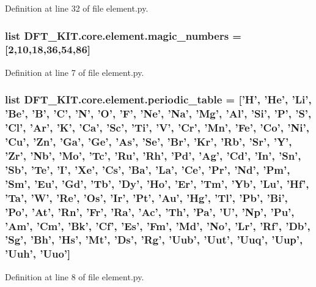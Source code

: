 Definition at line 32 of file element.\+py.

\hypertarget{namespace_d_f_t___k_i_t_1_1core_1_1element_a6e392fcf7a27f5558bd9ebbebbe5df2b}{
\subsubsection[{magic\+\_\+numbers}]{\setlength{\rightskip}{0pt plus 5cm}list D\+F\+T\+\_\+\+K\+I\+T.\+core.\+element.\+magic\+\_\+numbers = \mbox{[}2,10,18,36,54,86\mbox{]}}}\label{namespace_d_f_t___k_i_t_1_1core_1_1element_a6e392fcf7a27f5558bd9ebbebbe5df2b}


Definition at line 7 of file element.\+py.

\hypertarget{namespace_d_f_t___k_i_t_1_1core_1_1element_ad08038b96f87f0dcae06dc0f14cfcedd}{
\subsubsection[{periodic\+\_\+table}]{\setlength{\rightskip}{0pt plus 5cm}list D\+F\+T\+\_\+\+K\+I\+T.\+core.\+element.\+periodic\+\_\+table = \mbox{[}'H', 'He', 'Li', 'Be', 'B', 'C', 'N', 'O', 'F', 'Ne', 'Na', 'Mg', 'Al', 'Si', 'P', 'S', 'Cl', 'Ar', 'K', 'Ca', 'Sc', 'Ti', 'V', 'Cr', 'Mn', 'Fe', 'Co', 'Ni', 'Cu', 'Zn', 'Ga', 'Ge', 'As', 'Se', 'Br', 'Kr', 'Rb', 'Sr', 'Y', 'Zr', 'Nb', 'Mo', 'Tc', 'Ru', 'Rh', 'Pd', 'Ag', 'Cd', 'In', 'Sn', 'Sb', 'Te', 'I', 'Xe', 'Cs', 'Ba', 'La', 'Ce', 'Pr', 'Nd', 'Pm', 'Sm', 'Eu', 'Gd', 'Tb', 'Dy', 'Ho', 'Er', 'Tm', 'Yb', 'Lu', 'Hf', 'Ta', 'W', 'Re', 'Os', 'Ir', 'Pt', 'Au', 'Hg', 'Tl', 'Pb', 'Bi', 'Po', 'At', 'Rn', 'Fr', 'Ra', 'Ac', 'Th', 'Pa', 'U', 'Np', 'Pu', 'Am', 'Cm', 'Bk', 'Cf', 'Es', 'Fm', 'Md', 'No', 'Lr', 'Rf', 'Db', 'Sg', 'Bh', 'Hs', 'Mt', 'Ds', 'Rg', 'Uub', 'Uut', 'Uuq', 'Uup', 'Uuh', 'Uuo'\mbox{]}}}\label{namespace_d_f_t___k_i_t_1_1core_1_1element_ad08038b96f87f0dcae06dc0f14cfcedd}


Definition at line 8 of file element.\+py.

